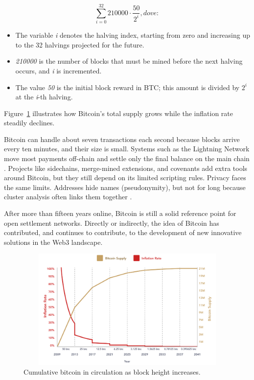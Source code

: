 \begin{equation*}
\sum\limits_{i=0}^{32}  210000 \cdot \frac{50}{2^i}       ,dove:
\end{equation*}

\begin{itemize}
\item The variable \textit{i} denotes the halving index, starting from zero and increasing up to the 32 halvings projected for the future.
\item \textit{210000} is the number of blocks that must be mined before the next halving occurs, and \textit{i} is incremented.
\item The value \textit{50} is the initial block reward in BTC; this amount is divided by $2^{i}$ at the \textit{i}-th halving.
\end{itemize}


Figure~\ref{btc_supply} illustrates how Bitcoin's total supply grows while the inflation rate steadily declines.

Bitcoin can handle about seven transactions each second because blocks arrive every ten minutes, and their size is small. Systems such as the Lightning Network move most payments off-chain and settle only the final balance on the main chain \cite{PoonDryja}. Projects like sidechains, merge-mined extensions, and covenants add extra tools around Bitcoin, but they still depend on its limited scripting rules. Privacy faces the same limits. Addresses hide names (pseudonymity), but not for long because cluster analysis often links them together \cite{Moser2013}.

After more than fifteen years online, Bitcoin is still a solid reference point for open settlement networks. Directly or indirectly, the idea of Bitcoin has contributed, and continues to contribute, to the development of new innovative solutions in the Web3 landscape.

\begin{figure}[h]
    \centering
    \includegraphics[width=12cm,height=6cm]{Images/Chap1/halving.png}
    \caption[Bitcoin issuance curve]{Cumulative bitcoin in circulation as block height increases.}
    \label{btc_supply}
\end{figure}

